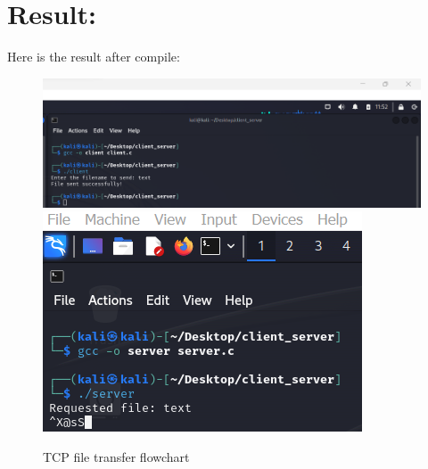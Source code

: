 \documentclass{article}
\begin{document}
\section{Result:}
Here is the result after compile:
\begin{figure}[h!]
    \centering
    \includegraphics[scale=0.5]{client.png}
    \includegraphics[scale=0.5]{server.png}
    \caption{TCP file transfer flowchart}
    \label{fig:enter-label}
\end{figure}
\end{document}
